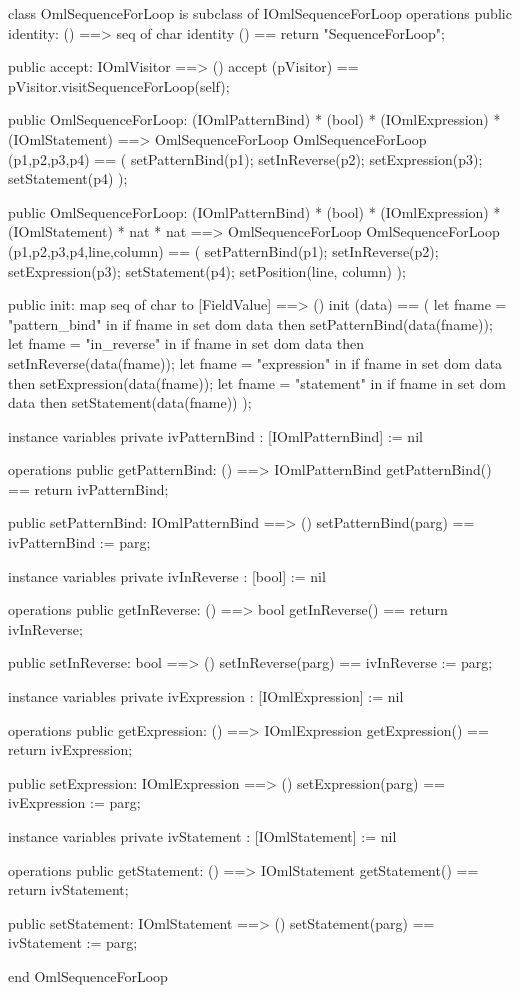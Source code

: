 \begin{vdm_al}
class OmlSequenceForLoop is subclass of IOmlSequenceForLoop
operations
  public identity: () ==> seq of char
  identity () == return "SequenceForLoop";

  public accept: IOmlVisitor ==> ()
  accept (pVisitor) == pVisitor.visitSequenceForLoop(self);

  public OmlSequenceForLoop:
    (IOmlPatternBind) *
    (bool) *
    (IOmlExpression) *
    (IOmlStatement) ==> OmlSequenceForLoop
  OmlSequenceForLoop (p1,p2,p3,p4) == 
    ( setPatternBind(p1);
      setInReverse(p2);
      setExpression(p3);
      setStatement(p4) );

  public OmlSequenceForLoop:
    (IOmlPatternBind) *
    (bool) *
    (IOmlExpression) *
    (IOmlStatement) *
    nat *
    nat ==> OmlSequenceForLoop
  OmlSequenceForLoop (p1,p2,p3,p4,line,column) == 
    ( setPatternBind(p1);
      setInReverse(p2);
      setExpression(p3);
      setStatement(p4);
      setPosition(line, column) );

  public init: map seq of char to [FieldValue] ==> ()
  init (data) ==
    ( let fname = "pattern_bind" in
        if fname in set dom data
        then setPatternBind(data(fname));
      let fname = "in_reverse" in
        if fname in set dom data
        then setInReverse(data(fname));
      let fname = "expression" in
        if fname in set dom data
        then setExpression(data(fname));
      let fname = "statement" in
        if fname in set dom data
        then setStatement(data(fname)) );

instance variables
  private ivPatternBind : [IOmlPatternBind] := nil

operations
  public getPatternBind: () ==> IOmlPatternBind
  getPatternBind() == return ivPatternBind;

  public setPatternBind: IOmlPatternBind ==> ()
  setPatternBind(parg) == ivPatternBind := parg;

instance variables
  private ivInReverse : [bool] := nil

operations
  public getInReverse: () ==> bool
  getInReverse() == return ivInReverse;

  public setInReverse: bool ==> ()
  setInReverse(parg) == ivInReverse := parg;

instance variables
  private ivExpression : [IOmlExpression] := nil

operations
  public getExpression: () ==> IOmlExpression
  getExpression() == return ivExpression;

  public setExpression: IOmlExpression ==> ()
  setExpression(parg) == ivExpression := parg;

instance variables
  private ivStatement : [IOmlStatement] := nil

operations
  public getStatement: () ==> IOmlStatement
  getStatement() == return ivStatement;

  public setStatement: IOmlStatement ==> ()
  setStatement(parg) == ivStatement := parg;

end OmlSequenceForLoop
\end{vdm_al}


